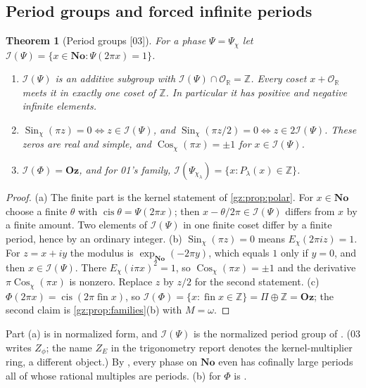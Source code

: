 \documentclass[11pt,a4paper]{article}
\numberwithin{equation}{section}
\newtheorem{theorem}{Theorem}[section]
\theoremstyle{definition}
\theoremstyle{remark}
\newcommand{\No}{\mathbf{No}}
\newcommand{\Oz}{\mathbf{Oz}}
\newcommand{\R}{\mathbb R}
\newcommand{\Z}{\mathbb Z}
\newcommand{\OO}{\mathcal O}
\newcommand{\fin}{\operatorname{fin}}
\newcommand{\cis}{\operatorname{cis}}
\newcommand{\Sin}{\operatorname{Sin}}
\newcommand{\Cos}{\operatorname{Cos}}
\newcommand{\cI}{\mathcal I}
\newcommand{\src}[1]{\textup{[#1]}}
\begin{document}
\subsection{Period groups and forced infinite periods}\label{gz:sec:periods}
\begin{theorem}[Period groups \src{03}]\label{gz:thm:periods}
For a phase $\Psi=\Psi_\chi$ let $\cI(\Psi)=\{x\in\No:\Psi(2\pi x)=1\}$.
\begin{enumerate}[label=(\alph*)]
\item $\cI(\Psi)$ is an additive subgroup with $\cI(\Psi)\cap\OO_\R=\Z$.
 Every coset $x+\OO_\R$ meets it in exactly one coset of $\Z$. In
 particular it has positive and negative infinite elements.
\item $\Sin_\chi(\pi z)=0\iff z\in\cI(\Psi)$, and
 $\Sin_\chi(\pi z/2)=0\iff z\in2\cI(\Psi)$. These zeros are real and
 simple, and $\Cos_\chi(\pi x)=\pm1$ for $x\in\cI(\Psi)$.
\item $\cI(\Phi)=\Oz$, and for 01's family, $\cI(\Psi_{\chi_\lambda})=\{x:P_\lambda(x)\in\Z\}$.
\end{enumerate}
\end{theorem}
\begin{proof}
(a) The finite part is the kernel statement of \cref{gz:prop:polar}. For
$x\in\No$ choose a finite $\theta$ with $\cis\theta=\Psi(2\pi x)$; then
$x-\theta/2\pi\in\cI(\Psi)$ differs from $x$ by a finite amount. Two
elements of $\cI(\Psi)$ in one finite coset differ by a finite period,
hence by an ordinary integer. (b) $\Sin_\chi(\pi z)=0$ means
$E_\chi(2\pi iz)=1$. For $z=x+iy$ the modulus is $\exp_{\No}(-2\pi y)$,
which equals $1$ only if $y=0$, and then $x\in\cI(\Psi)$. There
$E_\chi(i\pi x)^2=1$, so $\Cos_\chi(\pi x)=\pm1$ and the derivative
$\pi\Cos_\chi(\pi x)$ is nonzero. Replace $z$ by $z/2$ for the second
statement. (c) $\Phi(2\pi x)=\cis(2\pi\fin x)$, so $\cI(\Phi)=\{x:\fin x\in\Z\}=\Pi\oplus\Z=\Oz$;
the second claim is \cref{gz:prop:families}(b) with $M=\omega$.
\end{proof}
Part (a) is  in normalized form, and
$\cI(\Psi)$ is the normalized period group of
. (03 writes $Z_\phi$; the name
$Z_E$ in the trigonometry report denotes the kernel-multiplier ring, a
different object.) By , every phase on
$\No$ even has cofinally large periods all of whose rational multiples are
periods. (b) for $\Phi$ is .
\end{document}
